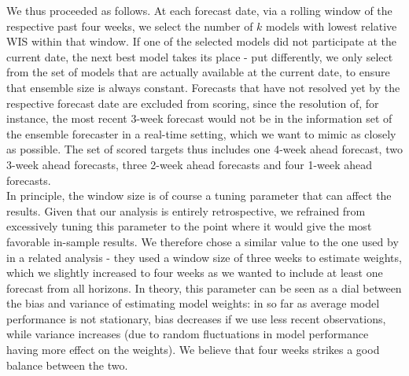 We thus proceeded as follows. At each forecast date, via a rolling window of the respective past four weeks, we select the number of $k$ models with lowest relative WIS within that window. If one of the selected models did not participate at the current date, the next best model takes its place - put differently, we only select from the set of models that are actually available at the current date, to ensure that ensemble size is always constant. Forecasts that have not resolved yet by the respective forecast date are excluded from scoring, since the resolution of, for instance, the most recent 3-week forecast would not be in the information set of the ensemble forecaster in a real-time setting, which we want to mimic as closely as possible. The set of scored targets thus includes one 4-week ahead forecast, two 3-week ahead forecasts, three 2-week ahead forecasts and four 1-week ahead forecasts.\\
In principle, the window size is of course a tuning parameter that can affect the results. Given that our analysis is entirely retrospective, we refrained from excessively tuning this parameter to the point where it would give the most favorable in-sample results. We therefore chose a similar value to the one used by \cite{bracher_pre-registered_2021} in a related analysis - they used a window size of three weeks to estimate weights, which we slightly increased to four weeks as we wanted to include at least one forecast from all horizons. In theory, this parameter can be seen as a dial between the bias and variance of estimating model weights: in so far as average model performance is not stationary, bias decreases if we use less recent observations, while variance increases (due to random fluctuations in model performance having more effect on the weights). We believe that four weeks strikes a good balance between the two. \\%

